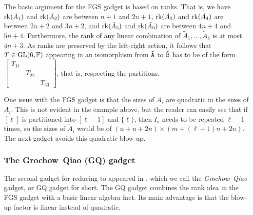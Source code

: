 \begin{example}
The basic argument for the FGS gadget is based on ranks. That is, we have $\mathrm{rk}(\tilde A_1)$ and $\mathrm{rk}(\tilde A_2)$ are between $n+1$ and $2n+1$, $\mathrm{rk}(\tilde A_3)$ and $\mathrm{rk}(\tilde A_4)$ are between $2n+2$ and $3n+2$, and $\mathrm{rk}(\tilde A_5)$ and $\mathrm{rk}(\tilde A_6)$ are between $4n+4$ and $5n+4$. Furthermore, the rank of any linear combination of $\tilde A_1, \dots, \tilde A_4$ is at most $4n+3$. As ranks are preserved by the left-right action, it follows that $T\in \mathrm{GL}(6, \mathbb{F})$ appearing in an isomorphism from $\tilde {\mathtt{A}}$ to $\tilde{\mathtt{B}}$ has to be of the form $\begin{bmatrix}
	T_{11} & & \\
	& T_{22} & \\
	& & T_{33}
\end{bmatrix}$, that is, respecting the partitions.
\end{example}

One issue with the FGS gadget is that the sizes of $\tilde A_i$ are quadratic in the sizes of $A_i$. This is not evident in the example above, but the reader can easily see that if $[\ell]$ is partitioned into $[\ell-1]$ and $\{\ell\}$, then $I_s$ needs to be repeated $\ell-1$ times, so the sizes of $\tilde A_i$ would be of $(n+n+2n)\times (m+(\ell-1)n+2n)$. The next gadget avoids this quadratic blow up.

\subsubsection{The Grochow--Qiao (GQ) gadget}\label{sec:GQ}

The second gadget for reducing \pTI to \TI appeared in \cite{TI4}, which we call the \emph{Grochow--Qiao} gadget, or GQ gadget for short. The GQ gadget combines the rank idea in the FGS gadget with a basic linear algebra fact. Its main advantage is that the blow-up factor is linear instead of quadratic. 

